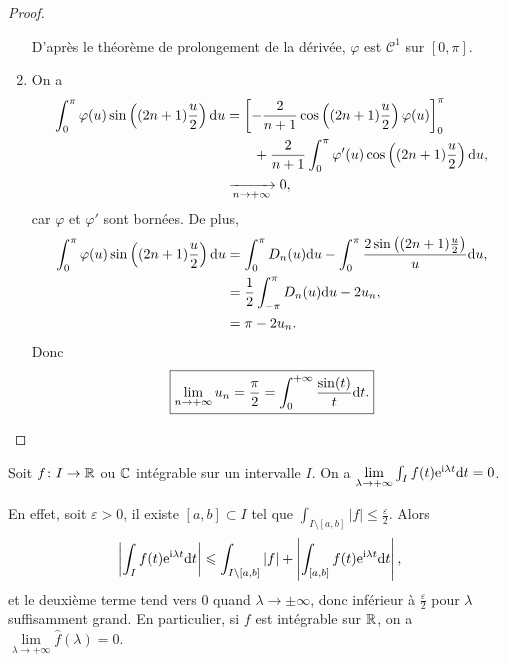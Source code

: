 \begin{proof}
\begin{enumerate}
        D'après le théorème de prolongement de la dérivée, $\varphi$ est $\mathcal{C}^{1}$ sur $[0,\pi]$.

        \item On a 
        \begin{align}
            \int_{0}^{\pi}\varphi(u)\sin\left((2n+1)\frac{u}{2}\right)\mathrm{d} u
            &=\left[-\frac{2}{n+1}\cos\left((2n+1)\frac{u}{2}\right)\varphi(u)\right]_{0}^{\pi}\nonumber\\
            &\qquad+\frac{2}{n+1}\int_{0}^{\pi}\varphi'(u)\cos\left((2n+1)\frac{u}{2}\right)\mathrm{d} u,\\
            &\xrightarrow[n\to+\infty]{}0,
        \end{align}
        car $\varphi$ et $\varphi'$ sont bornées. De plus,
        \begin{align}
            \int_{0}^{\pi}\varphi(u)\sin\left((2n+1)\frac{u}{2}\right)\mathrm{d} u
            &=\int_{0}^{\pi}D_n(u)\mathrm{d} u-\int_{0}^{\pi}\frac{2\sin\left((2n+1)\frac{u}{2}\right)}{u}\mathrm{d} u,\\
            &=\frac{1}{2}\int_{-\pi}^{\pi}D_n(u)\mathrm{d} u-2u_n,\\
            &=\pi-2u_n.
        \end{align}
        Donc
        \begin{equation}
            \boxed{
                \lim\limits_{n\to+\infty}u_n=\frac{\pi}{2}=\int_{0}^{+\infty}\frac{\sin(t)}{t}\mathrm{d} t.
            }
        \end{equation}
    \end{enumerate}
\end{proof}

\begin{remark}
    Soit $f\colon I\to\mathbb{R}$ ou $\mathbb{C}$ intégrable sur un intervalle $I$. On a $\lim\limits_{\lambda\to+\infty}\int_{I}f(t)\mathrm{e}^{\mathrm{i}\lambda t}\mathrm{d} t=0$.

    En effet, soit $\varepsilon>0$, il existe $[a,b]\subset I$ tel que $\int_{I\setminus[a,b]}\left\lvert f\right\rvert\leqslant\frac{\varepsilon}{2}$. Alors 
    \begin{equation}
        \left\lvert\int_{I}f(t)\mathrm{e}^{\mathrm{i}\lambda t}\mathrm{d} t\right\rvert\leqslant\int_{I\setminus[a,b]}\left\lvert f\right\rvert+\left\lvert\int_{[a,b]}f(t)\mathrm{e}^{\mathrm{i}\lambda t}\mathrm{d} t\right\rvert,
    \end{equation}
    et le deuxième terme tend vers 0 quand $\lambda\to \pm\infty$, donc inférieur à $\frac{\varepsilon}{2}$ pour $\lambda$ suffisamment grand. En particulier, si $f$ est intégrable sur $\mathbb{R}$, on a $\lim\limits_{\lambda\to+\infty}\widehat{f}(\lambda)=0$.
\end{remark}

